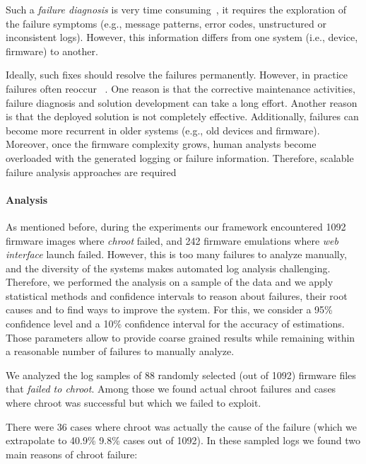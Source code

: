 \documentclass[conference]{./templates/ndss/IEEEtran}
\newcounter{t0d0_counter}
\newcounter{pr00f_counter}
\newcommand{\CountFirmwareEmulatedNOTOK}{1092}
\newcommand{\CountFirmwareEmulatedWebServerNOTStarted}{242}
\newcommand{\EmulatedNOTOKRandSampl}{88}
\newcommand{\EmulatedNOTOKRandSamplChrootFail}{36}
\newcommand{\EmulatedNOTOKRandSamplChrootFailPct}{40.9\%}
\newcommand{\EmulatedNOTOKRandSamplChrootFailConfInt}{9.8\%}
\begin{document}
Such a \emph{failure diagnosis} is very time consuming~\cite{li2010cost}, 
it requires the exploration of the failure symptoms 
(e.g., message patterns, error codes, unstructured or inconsistent logs). 
However, this information differs from one system (i.e., device, firmware) 
to another. 

Ideally, such fixes should resolve the failures permanently.
However, in practice failures often reoccur ~\cite{lee2000diagnosing}.
One reason is that the corrective maintenance activities, failure diagnosis 
and solution development can take a long effort. Another reason is that 
the deployed solution is not completely effective. 
Additionally, failures can become more recurrent in older systems 
(e.g., old devices and firmware). Moreover, once the firmware complexity grows, human analysts become
overloaded with the generated logging or failure information.
Therefore, scalable failure analysis approaches are required 


\paragraph{Analysis}

As mentioned before, during the experiments our framework encountered 
\CountFirmwareEmulatedNOTOK{} firmware images where \emph{chroot} failed, and 
\CountFirmwareEmulatedWebServerNOTStarted{} firmware emulations where 
\emph{web interface} launch failed. 
However, this is too many failures to analyze manually, and the 
diversity of the systems makes automated log analysis challenging.
Therefore, we performed the analysis on a sample of the data and 
we apply statistical methods and confidence intervals to reason 
about failures, their root causes and to find ways to improve the system.
    For this, we consider a 95\% confidence level and a  10\% confidence 
interval for the accuracy of estimations. Those parameters allow to provide coarse grained 
results while remaining within a reasonable number of failures to manually analyze. 


We analyzed the log samples of \EmulatedNOTOKRandSampl{} randomly
selected (out of \CountFirmwareEmulatedNOTOK{}) firmware files that
\emph{failed to chroot}. Among those we found actual chroot failures
and cases where chroot was successful but which we failed to exploit.

    There were \EmulatedNOTOKRandSamplChrootFail{} cases where chroot 
was actually the cause of the failure (which we extrapolate to \EmulatedNOTOKRandSamplChrootFailPct{} 
 \EmulatedNOTOKRandSamplChrootFailConfInt{} cases out of \CountFirmwareEmulatedNOTOK{}). 
In these sampled logs we found two main reasons of chroot failure:
\end{document}
